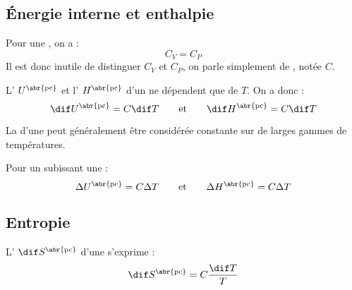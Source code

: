 \subsection{Énergie interne et enthalpie}

\begin{propriete}
Pour une , on a :
\[C_V = C_P\]
Il est donc inutile de distinguer $C_V$ et $C_P$, on parle simplement de , notée $C$.
\end{propriete}

\begin{propriete}[admis]
L' $U^{\text{\abr{pc}}}$ et l' $H^{\text{\abr{pc}}}$ d'un  ne dépendent que de $T$. On a donc :
\[\dif U^{\text{\abr{pc}}} = C \dif T \qquad \text{et} \qquad \dif H^{\text{\abr{pc}}} = C \dif T\]
\end{propriete}

\begin{remarque}
La  d'une  peut généralement être considérée constante sur de larges gammes de températures.
\end{remarque}

\begin{propriete}
Pour un  subissant une  :
\[\Delta U^{\text{\abr{pc}}} = C \Delta T \qquad \text{et} \qquad \Delta H^{\text{\abr{pc}}} = C \Delta T\]
\end{propriete}



\subsection{Entropie}

\begin{propriete}
L' $\dif S^{\text{\abr{pc}}}$ d'une  s'exprime :
\[\dif S^{\text{\abr{pc}}} = C \frac{\dif T}{T}\]
\end{propriete}